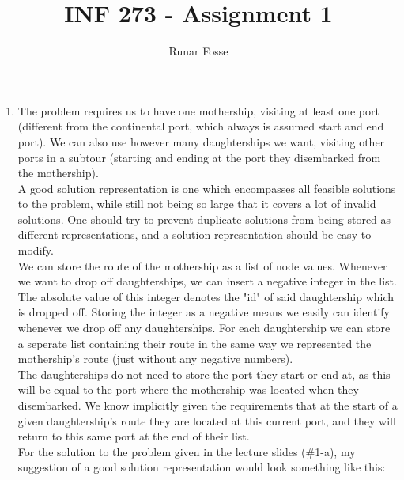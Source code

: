 \documentclass{article}
\title{\vspace{-2.0cm}INF 273 - Assignment 1}
\author{Runar Fosse}
\date{}
\begin{document}
\maketitle

\begin{enumerate}[label=(\alph*)]
    \item The problem requires us to have one mothership, visiting at least one port (different from the continental port, which always is assumed start and end port). We can also use however many daughterships we want, visiting other ports in a subtour (starting and ending at the port they disembarked from the mothership).
    \\[10pt]
    A good solution representation is one which encompasses all feasible solutions to the problem, while still not being so large that it covers a lot of invalid solutions. One should try to prevent duplicate solutions from being stored as different representations, and a solution representation should be easy to modify.
    \\[10pt]
    We can store the route of the mothership as a list of node values. Whenever we want to drop off daughterships, we can insert a negative integer in the list. The absolute value of this integer denotes the "id" of said daughtership which is dropped off. Storing the integer as a negative means we easily can identify whenever we drop off any daughterships. For each daughtership we can store a seperate list containing their route in the same way we represented the mothership's route (just without any negative numbers).
    \\[10pt]
    The daughterships do not need to store the port they start or end at, as this will be equal to the port where the mothership was located when they disembarked. We know implicitly given the requirements that at the start of a given daughtership's route they are located at this current port, and they will return to this same port at the end of their list.
    \\[10pt]
    For the solution to the problem given in the lecture slides (\#1-a), my suggestion of a good solution representation would look something like this:
    \\[30pt]
    
\end{enumerate}
\end{document}
